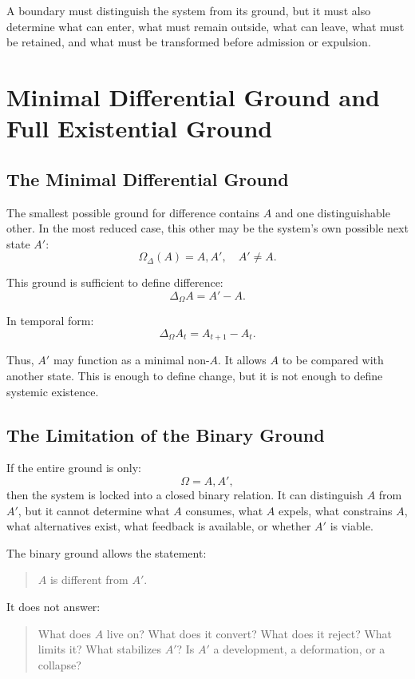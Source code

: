 \documentclass[11pt,a4paper]{article}
\begin{document}
A boundary must distinguish the system from its ground, but it must also determine what can enter, what must remain outside, what can leave, what must be retained, and what must be transformed before admission or expulsion.

\section{Minimal Differential Ground and Full Existential Ground}

\subsection{The Minimal Differential Ground}

The smallest possible ground for difference contains $A$ and one distinguishable other. In the most reduced case, this other may be the system's own possible next state $A'$:
\[
\Omega_{\Delta}(A)={A,A'},\quad A'\neq A.
\]

This ground is sufficient to define difference:
\[
\Delta_{\Omega}A=A'-A.
\]

In temporal form:
\[
\Delta_{\Omega}A_t=A_{t+1}-A_t.
\]

Thus, $A'$ may function as a minimal non-$A$. It allows $A$ to be compared with another state. This is enough to define change, but it is not enough to define systemic existence.

\subsection{The Limitation of the Binary Ground}

If the entire ground is only:
\[
\Omega={A,A'},
\]
then the system is locked into a closed binary relation. It can distinguish $A$ from $A'$, but it cannot determine what $A$ consumes, what $A$ expels, what constrains $A$, what alternatives exist, what feedback is available, or whether $A'$ is viable.

The binary ground allows the statement:
\begin{quote}
$A$ is different from $A'$.
\end{quote}

It does not answer:
\begin{quote}
What does $A$ live on? What does it convert? What does it reject? What limits it? What stabilizes $A'$? Is $A'$ a development, a deformation, or a collapse?
\end{quote}
\end{document}
